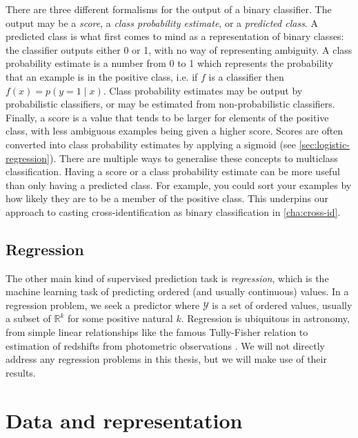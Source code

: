 \documentclass[11pt, a4paper]{book}
\newcommand{\defn}[1]{\emph{#1}}
\begin{document}
        There are three different formalisms for the output of a binary classifier. The output may be a \defn{score}, a \defn{class probability estimate}, or a \defn{predicted class}. A predicted class is what first comes to mind as a representation of binary classes: the classifier outputs either 0 or 1, with no way of representing ambiguity. A class probability estimate is a number from 0 to 1 which represents the probability that an example is in the positive class, i.e. if $f$ is a classifier then $f(x) = p(y = 1 \mid x)$. Class probability estimates may be output by probabilistic classifiers, or may be estimated from non-probabilistic classifiers. Finally, a score is a value that tends to be larger for elements of the positive class, with less ambiguous examples being given a higher score. Scores are often converted into class probability estimates by applying a sigmoid (see \autoref{sec:logistic-regression}). There are multiple ways to generalise these concepts to multiclass classification. Having a score or a class probability estimate can be more useful than only having a predicted class. For example, you could sort your examples by how likely they are to be a member of the positive class. This underpins our approach to casting cross-identification as binary classification in \autoref{cha:cross-id}.

    \subsection{Regression}
    \label{sec:regression}

        The other main kind of supervised prediction task is \defn{regression}, which is the machine learning task of predicting ordered (and usually continuous) values. In a regression problem, we seek a predictor where $\mathcal Y$ is a set of ordered values, usually a subset of $\mathbb R^k$ for some positive natural $k$. Regression is ubiquitous in astronomy, from simple linear relationships like the famous Tully-Fisher relation \citep{tully_new_1977} to estimation of redshifts from photometric observations \citep[called \defn{photometric redshifts}; first introduced by][]{baum_photoelectric_1962}. We will not directly address any regression problems in this thesis, but we will make use of their results.

\section{Data and representation}
\label{sec:data-and-representation}
\end{document}
